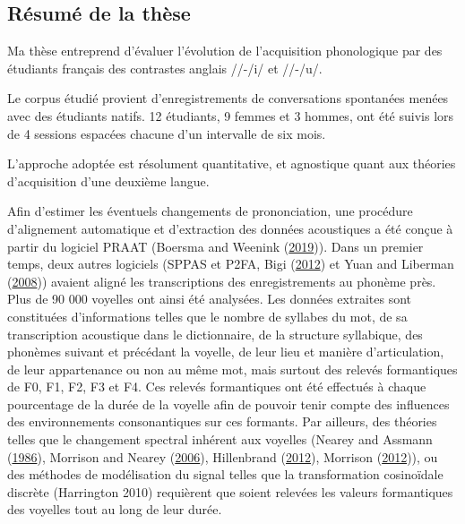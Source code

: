 \documentclass[
  10pt,
]{article}
\begin{document}
\hypertarget{ruxe9sumuxe9-de-la-thuxe8se}{%
\subsection{Résumé de la thèse}\label{ruxe9sumuxe9-de-la-thuxe8se}}

Ma thèse entreprend d'évaluer l'évolution de l'acquisition phonologique par des étudiants français
des contrastes anglais //-/i\textipa{:}/ et //-/u\textipa{:}/.

Le corpus étudié provient d'enregistrements de conversations spontanées menées avec des étudiants natifs. 12 étudiants, 9 femmes et 3 hommes, ont été suivis lors de 4 sessions espacées
chacune d'un intervalle de six mois.

L'approche adoptée est résolument quantitative, et agnostique quant aux théories d'acquisition
d'une deuxième langue.

Afin d'estimer les éventuels changements de prononciation, une procédure d'alignement automatique et d'extraction des données acoustiques a été conçue à partir du logiciel PRAAT (Boersma and Weenink (\protect\hyperlink{ref-praat}{2019})). Dans un premier temps, deux autres logiciels (SPPAS et P2FA, Bigi (\protect\hyperlink{ref-sppas2012}{2012}) et Yuan and Liberman (\protect\hyperlink{ref-p2fa}{2008})) avaient aligné les transcriptions des enregistrements au phonème près. Plus de 90 000
voyelles ont ainsi été analysées. Les données extraites sont constituées d'informations telles que
le nombre de syllabes du mot, de sa transcription acoustique dans le dictionnaire, de la structure
syllabique, des phonèmes suivant et précédant la voyelle, de leur lieu et manière d'articulation, de
leur appartenance ou non au même mot, mais surtout des relevés formantiques de F0, F1, F2, F3
et F4. Ces relevés formantiques ont été effectués à chaque pourcentage de la durée de la voyelle
afin de pouvoir tenir compte des influences des environnements consonantiques sur ces formants.
Par ailleurs, des théories telles que le changement spectral inhérent aux voyelles (Nearey and Assmann (\protect\hyperlink{ref-nearey1986}{1986}), Morrison and Nearey (\protect\hyperlink{ref-morrison2006}{2006}), Hillenbrand (\protect\hyperlink{ref-hillenbrand2012}{2012}), Morrison (\protect\hyperlink{ref-morrison2012}{2012})), ou des méthodes
de modélisation du signal telles que la transformation cosinoïdale discrète (Harrington 2010) requièrent que soient relevées les valeurs formantiques des voyelles tout au long de leur durée.
\end{document}
